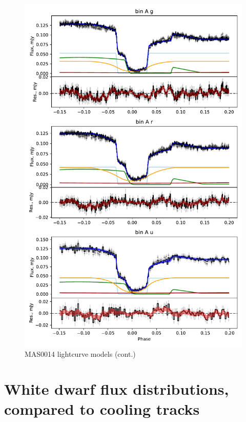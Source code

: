 \begin{figure}
    \centering
    \includegraphics[width=\textwidth]{figures/results/MASOT0014/MASOT0014_3.pdf}
    \caption{MAS0014 lightcurve models (cont.)}
    \label{fig:MAS0014 all lightcurves cont 2}
\end{figure}



\section{White dwarf flux distributions, compared to cooling tracks}
\label{appendix:white dwarf fluxes}

